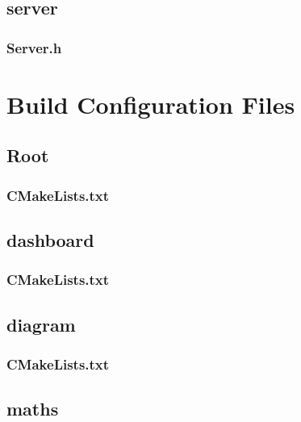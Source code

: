 \subsection*{server}

\subsubsection*{Server.h}


\section{Build Configuration Files}

\subsection*{Root}

\subsubsection*{CMakeLists.txt}


\subsection*{dashboard}

\subsubsection*{CMakeLists.txt}


\subsection*{diagram}

\subsubsection*{CMakeLists.txt}


\subsection*{maths}

